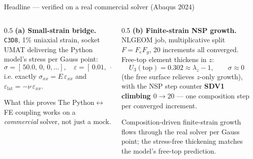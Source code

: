 \documentclass[aspectratio=169,xcolor=dvipsnames]{beamer}
\begin{document}
\begin{frame}{Headline — verified on a real commercial solver (Abaqus 2024)}
\begin{columns}[T]
\begin{column}{0.5\textwidth}
\textbf{(a) Small-strain bridge.} \texttt{C3D8}, 1\% uniaxial strain, socket UMAT delivering the
Python model's stress per Gauss point:
\[
\sigma = [\,50.0,\,0,\,0,\dots],\quad \varepsilon=[\,0.01,\,{-}0.0045,\,{-}0.0045,\dots]
\]
i.e. exactly $\sigma_{xx}=E\,\varepsilon_{xx}$ and $\varepsilon_{\text{lat}}=-\nu\,\varepsilon_{xx}$.
\begin{block}{\small What this proves}
\footnotesize The Python$\leftrightarrow$FE coupling works on a \emph{commercial} solver, not just a mock.
\end{block}
\end{column}
\begin{column}{0.5\textwidth}
\textbf{(b) Finite-strain NSP growth.} NLGEOM job, multiplicative split $F=F_e F_g$, 20
increments all converged. Free-top element thickens in $z$:
\[
U_3(\text{top}) = 0.302 \approx \lambda_z-1,\qquad \sigma \approx 0
\]
(the free surface relieves $z$-only growth), with the NSP step counter
\textbf{SDV1 climbing $0\to20$} — one composition step per converged increment.
\vspace{0.4em}

\footnotesize Composition-driven finite-strain growth flows through the real solver per Gauss point;
the stress-free thickening matches the model's free-top prediction.
\end{column}
\end{columns}
\end{frame}
\end{document}
